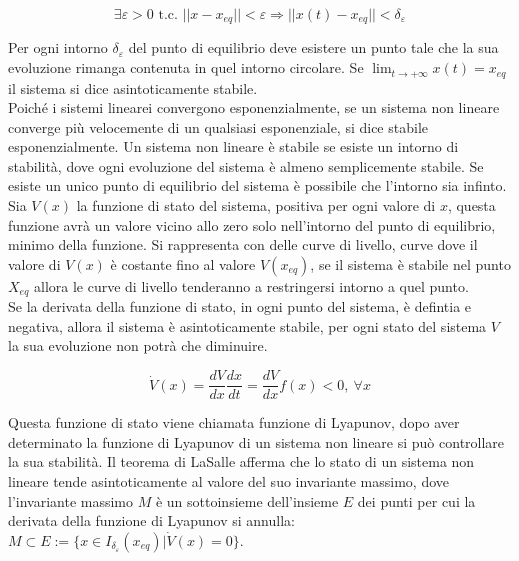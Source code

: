 \documentclass{article}
\numberwithin{equation}{subsection}
\begin{document}
\begin{equation}
    \exists\varepsilon>0\mbox{ t.c. }||x-x_{eq}||<\varepsilon\Rightarrow||x(t)-x_{eq}||<\delta_{\varepsilon}
\end{equation}

Per ogni intorno $\delta_{\varepsilon}$ del punto di equilibrio deve esistere un punto tale che la sua evoluzione rimanga contenuta in quel intorno circolare. 
Se $\lim_{t\to+\infty}x(t)=x_{eq}$ il sistema si dice asintoticamente stabile. \\

Poiché i sistemi linearei convergono esponenzialmente, se un sistema non lineare converge più velocemente di un qualsiasi esponenziale, si dice stabile esponenzialmente. 
Un sistema non lineare è stabile se esiste un intorno di stabilità, dove ogni evoluzione del sistema è almeno semplicemente stabile. Se esiste un unico punto di equilibrio del 
sistema è possibile che l'intorno sia infinto. \\

Sia $V(x)$ la funzione di stato del sistema, positiva per ogni valore di $x$, questa funzione avrà un valore vicino allo zero solo 
nell'intorno del punto di equilibrio, minimo della funzione. Si rappresenta con delle curve di livello, curve dove il valore di $V(x)$ è costante fino al valore 
$V(x_{eq})$, se il sistema è stabile nel punto $X_{eq}$ allora le curve di livello tenderanno a restringersi intorno a quel punto. \\

Se la derivata della funzione di stato, in ogni punto del sistema, è defintia e negativa, allora il sistema è asintoticamente stabile, per ogni stato del sistema $V$ la sua 
evoluzione non potrà che diminuire.

\begin{equation}
    \dot V(x)=\displaystyle\frac{dV}{dx}\frac{dx}{dt}=\frac{dV}{dx}f(x)<0,\:\forall x
\end{equation}

Questa funzione di stato viene chiamata funzione di Lyapunov, dopo aver determinato la funzione di Lyapunov di un sistema non lineare si può controllare la sua stabilità. 
Il teorema di LaSalle afferma che lo stato di un sistema non lineare tende asintoticamente al valore del suo invariante massimo, dove l'invariante massimo $M$ è un sottoinsieme 
dell'insieme $E$ dei punti per cui la derivata della funzione di Lyapunov si annulla: $M\subset E:=\{x\in I_{\delta_{\varepsilon}}(x_{eq})\big|\dot V(x)=0\}$. \\
\end{document}

